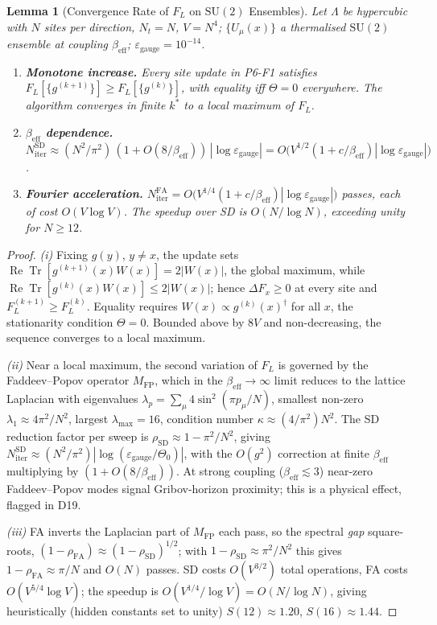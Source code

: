 \documentclass[11pt,a4paper]{article}
\theoremstyle{plain}
\newtheorem{lemma}{Lemma}
\theoremstyle{definition}
\theoremstyle{remark}
\newcommand{\SU}{\mathrm{SU}}
\newcommand{\Tr}{\operatorname{Tr}}
\renewcommand{\Re}{\operatorname{Re}}
\newcommand{\be}{\beta_{\mathrm{eff}}}
\newcommand{\epsg}{\varepsilon_{\mathrm{gauge}}}
\newcommand{\FL}{F_{L}}
\newcommand{\Nt}{N_{t}}
\begin{document}
\setcounter{lemma}{3}
\begin{lemma}[Convergence Rate of $\FL$ on $\SU(2)$ Ensembles]
Let $\Lambda$ be hypercubic with $N$ sites per direction, $\Nt=N$,
$V=N^4$; $\{U_\mu(x)\}$ a thermalised $\SU(2)$ ensemble at coupling
$\be$; $\epsg=10^{-14}$.
\begin{enumerate}[label=(\roman*)]
\item \textbf{Monotone increase.} Every site update in P6-F1 satisfies
$\FL[\{g^{(k+1)}\}]\ge\FL[\{g^{(k)}\}]$, with equality iff $\Theta=0$
everywhere. The algorithm converges in finite $k^{*}$ to a local
maximum of $\FL$.
\item \textbf{$\be$ dependence.}
$N_{\mathrm{iter}}^{\mathrm{SD}}\approx(N^2/\pi^2)\,
(1+O(8/\be))\,|\log\epsg|=O\!\bigl(V^{1/2}(1+c/\be)|\log\epsg|\bigr)$.
\item \textbf{Fourier acceleration.}
$N_{\mathrm{iter}}^{\mathrm{FA}}=O\!\bigl(V^{1/4}(1+c/\be)|\log\epsg|\bigr)$
passes, each of cost $O(V\log V)$. The speedup over SD is $O(N/\log N)$,
exceeding unity for $N\ge12$.
\end{enumerate}
\end{lemma}

\begin{proof}
\textit{(i)} Fixing $g(y)$, $y\ne x$, the update sets
$\Re\Tr[g^{(k+1)}(x)W(x)]=2|W(x)|$, the global maximum, while
$\Re\Tr[g^{(k)}(x)W(x)]\le 2|W(x)|$; hence $\Delta F_x\ge0$ at every
site and $\FL^{(k+1)}\ge\FL^{(k)}$. Equality requires $W(x)\propto
g^{(k)}(x)^{\dagger}$ for all $x$, the stationarity condition
$\Theta=0$. Bounded above by $8V$ and non-decreasing, the sequence
converges to a local maximum.

\textit{(ii)} Near a local maximum, the second variation of $\FL$ is
governed by the Faddeev--Popov operator $M_{\mathrm{FP}}$, which in the
$\be\to\infty$ limit reduces to the lattice Laplacian with eigenvalues
$\lambda_p=\sum_\mu 4\sin^2(\pi p_\mu/N)$, smallest non-zero
$\lambda_1\approx4\pi^2/N^2$, largest $\lambda_{\max}=16$, condition
number $\kappa\approx(4/\pi^2)N^2$. The SD reduction factor per sweep is
$\rho_{\mathrm{SD}}\approx1-\pi^2/N^2$, giving
$N_{\mathrm{iter}}^{\mathrm{SD}}\approx(N^2/\pi^2)|\log(\epsg/\Theta_0)|$,
with the $O(g^2)$ correction at finite $\be$ multiplying by
$(1+O(8/\be))$. At strong coupling ($\be\lesssim3$) near-zero
Faddeev--Popov modes signal Gribov-horizon proximity; this is a physical
effect, flagged in D19.

\textit{(iii)} FA inverts the Laplacian part of $M_{\mathrm{FP}}$ each
pass, so the spectral \emph{gap} square-roots,
$(1-\rho_{\mathrm{FA}})\approx(1-\rho_{\mathrm{SD}})^{1/2}$; with
$1-\rho_{\mathrm{SD}}\approx\pi^2/N^2$ this gives
$1-\rho_{\mathrm{FA}}\approx\pi/N$ and $O(N)$ passes. SD costs
$O(V^{3/2})$ total operations, FA costs $O(V^{5/4}\log V)$; the speedup
is $O(V^{1/4}/\log V)=O(N/\log N)$, giving heuristically (hidden constants
set to unity) $S(12)\approx1.20$, $S(16)\approx1.44$.
\end{proof}
\end{document}
